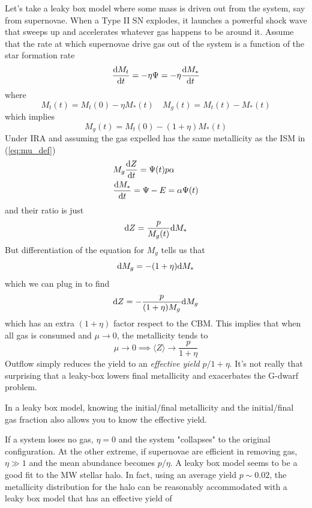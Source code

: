 Let's take a leaky box model where some mass is driven out from the system, say from supernovae. When a Type II SN explodes, it launches a powerful shock wave that sweeps up and accelerates whatever gas happens to be around it. Assume that the rate at which supernovae drive gas out of the system is a function of the star formation rate
\begin{equation*}
    \frac{\text{d}M_{t}}{\text{d}t} = -\eta\Psi = -\eta\frac{\text{d}M_{*}}{\text{d}t}
\end{equation*}
where 
\begin{equation*}
    M_{t}(t) = M_{t}(0)-\eta M_{*}(t) \quad M_{g}(t) = M_{t}(t)-M_{*}(t)
\end{equation*}
which implies
\begin{equation*}
    M_{g}(t) = M_{t}(0)-(1+\eta)M_{*}(t)
\end{equation*}
Under IRA and assuming the gas expelled has the same metallicity as the ISM in (\ref{eq:mu_def})
\begin{align*}
    &M_{g}\frac{\text{d}Z}{\text{d}t} = \Psi(t)p\alpha\\
    &\frac{\text{d}M_{*}}{\text{d}t} = \Psi - E = \alpha\Psi(t)
\end{align*}
and their ratio is just 
\begin{equation*}
    \text{d}Z = \frac{p}{M_{g}(t)}\text{d}M_{*}
\end{equation*}
But differentiation of the equation for $M_{g}$ tells us that 
\begin{equation*}
    \text{d}M_{g} = -(1+\eta)\text{d}M_{*}
\end{equation*}
which we can plug in to find 
\begin{equation}
    \text{d}Z = -\frac{p}{(1+\eta)M_{g}}\text{d}M_{g}
    \label{eq:metallicity_om}
\end{equation}
which has an extra $(1+\eta)$ factor respect to the CBM. This implies that when all gas is consumed and $\mu\to 0$, the metallicity tends to
\begin{equation*}
    \mu \to 0 \implies \langle Z \rangle \to \frac{p}{1+\eta}
\end{equation*}
Outflow simply reduces the yield to an \emph{effective yield} $p/1+\eta$. It's not really that surprising that a leaky-box lowers final metallicity and exacerbates the G-dwarf problem.
\par In a leaky box model, knowing the initial/final metallicity and the initial/final gas fraction also allows you to know the effective yield.
\par If a system loses no gas, $\eta = 0$ and the system "collapses" to the original configuration. At the other extreme, if supernovae are efficient in removing gas, $\eta \gg 1$ and the mean abundance becomes $p/\eta$. A leaky box model seems to be a good fit to the MW stellar halo. In fact, using an average yield $p \sim 0.02$, the metallicity distribution for the halo can be reasonably accommodated with a leaky box model that has an effective yield of
